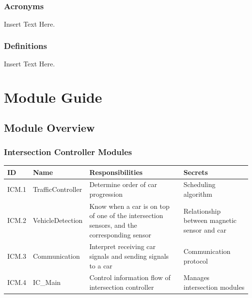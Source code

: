 \documentclass [10pt]{article}
\begin{document}
\subsubsection{Acronyms}
Insert Text Here. 

\subsubsection{Definitions}
Insert Text Here. 

\section{Module Guide}

\subsection{Module Overview}

\subsubsection{Intersection Controller Modules}

\begin{longtable}{ |p{ }  | p{ } |  p{ } |  p{ } |}  \hline
    
    \textbf{ID} & \textbf{Name} &  \textbf{Responsibilities} & \textbf{Secrets} \\ \hline
    
    \cellcolor{tableCell}ICM.1  & \cellcolor{tableCell}TrafficController & \cellcolor{tableCell}Determine order of car progression & \cellcolor{tableCell} Scheduling algorithm \\ \hline
    
    ICM.2 & VehicleDetection & Know when a car is on top of one of the intersection sensors, and the corresponding sensor & Relationship between magnetic sensor and car \\ \hline
    
    \cellcolor{tableCell}ICM.3  & \cellcolor{tableCell}Communication & \cellcolor{tableCell}Interpret receiving car signals and sending signals to a car & \cellcolor{tableCell}Communication protocol \\ \hline
    
    
        ICM.4 & IC\_Main & Control information flow of intersection controller & Manages intersection modules \\ \hline

\end{longtable}
\end{document}

